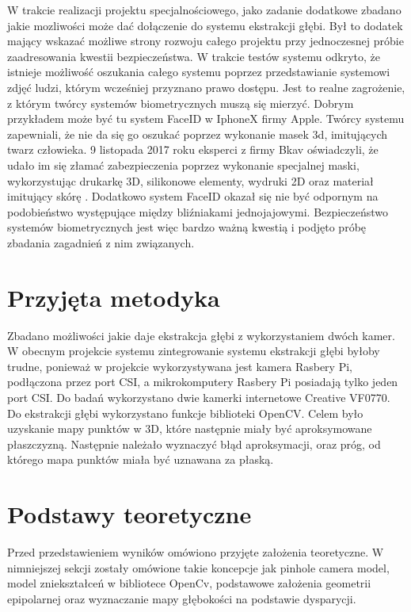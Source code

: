 \documentclass[oneside, eng]{mgr}
\begin{document}
W trakcie realizacji projektu specjalnościowego, jako zadanie dodatkowe zbadano jakie mozliwości może dać dołączenie do systemu ekstrakcji głębi. Był to dodatek mający wskazać możliwe strony rozwoju całego projektu przy jednoczesnej próbie zaadresowania kwestii bezpieczeństwa. W trakcie testów systemu odkryto, że istnieje możliwość oszukania całego systemu poprzez przedstawianie systemowi zdjęć ludzi, którym wcześniej przyznano prawo dostępu. Jest to realne zagrożenie, z którym twórcy systemów biometrycznych muszą się mierzyć. Dobrym przykładem może być tu system FaceID w IphoneX firmy Apple. Twórcy systemu zapewniali, że nie da się go oszukać poprzez wykonanie masek 3d, imitujących twarz człowieka. 9 listopada 2017 roku eksperci z firmy Bkav oświadczyli, że udało im się złamać zabezpieczenia poprzez wykonanie specjalnej maski, wykorzystując drukarkę 3D, silikonowe elementy, wydruki 2D oraz materiał imitujący skórę \cite{FaceID hacked}. Dodatkowo system FaceID okazał się nie być odpornym na podobieństwo występujące między bliźniakami jednojajowymi. Bezpieczeństwo systemów biometrycznych jest więc bardzo ważną kwestią i podjęto próbę zbadania zagadnień z nim związanych.

\section{Przyjęta metodyka}
Zbadano możliwości jakie daje ekstrakcja głębi z wykorzystaniem dwóch kamer. W obecnym projekcie systemu zintegrowanie systemu ekstrakcji głębi byłoby trudne, ponieważ w projekcie wykorzystywana jest kamera Rasbery Pi, podłączona przez port CSI, a mikrokomputery Rasbery Pi posiadają tylko jeden port CSI. Do badań wykorzystano dwie kamerki internetowe Creative VF0770. Do ekstrakcji głębi wykorzystano funkcje biblioteki OpenCV. Celem było uzyskanie mapy punktów w 3D, które następnie miały być aproksymowane płaszczyzną. Następnie należało wyznaczyć błąd aproksymacji, oraz próg, od którego mapa punktów miała być uznawana za płaską.

\section{Podstawy teoretyczne}

Przed przedstawieniem wyników omówiono przyjęte założenia teoretyczne. W nimniejszej sekcji zostały omówione takie koncepcje jak pinhole camera model, model zniekształceń w bibliotece OpenCv, podstawowe założenia geometrii epipolarnej oraz wyznaczanie mapy głębokości na podstawie dysparycji.
\end{document}
